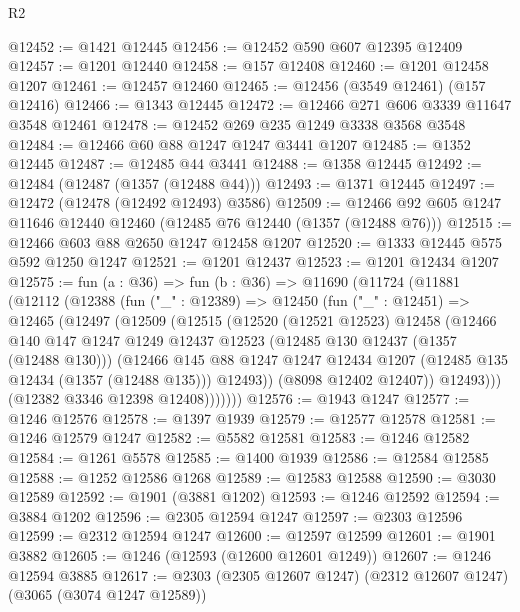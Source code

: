 \begin{lexlean}{R2}
\begin{coremodule}
@12452 := @1421 @12445
@12456 := @12452 @590 @607 @12395 @12409
@12457 := @1201 @12440
@12458 := @157 @12408
@12460 := @1201 @12458 @1207
@12461 := @12457 @12460
@12465 := @12456 (@3549 @12461) (@157 @12416)
@12466 := @1343 @12445
@12472 := @12466 @271 @606 @3339 @11647 @3548 @12461
@12478 := @12452 @269 @235 @1249 @3338 @3568 @3548
@12484 := @12466 @60 @88 @1247 @1247 @3441 @1207
@12485 := @1352 @12445
@12487 := @12485 @44 @3441
@12488 := @1358 @12445
@12492 := @12484 (@12487 (@1357 (@12488 @44)))
@12493 := @1371 @12445
@12497 := @12472 (@12478 (@12492 @12493) @3586)
@12509 := @12466 @92 @605 @1247 @11646 @12440 @12460 (@12485 @76 @12440 (@1357 (@12488 @76)))
@12515 := @12466 @603 @88 @2650 @1247 @12458 @1207
@12520 := @1333 @12445 @575 @592 @1250 @1247
@12521 := @1201 @12437
@12523 := @1201 @12434 @1207
@12575 := fun (a : @36) =>
  fun (b : @36) =>
  @11690
    (@11724
      (@11881
        (@12112
          (@12388
            (fun ("_" : @12389) =>
            @12450
              (fun ("_" : @12451) =>
              @12465
                (@12497
                  (@12509
                    (@12515
                      (@12520
                        (@12521 @12523)
                        @12458
                        (@12466
                          @140
                          @147
                          @1247
                          @1249
                          @12437
                          @12523
                          (@12485 @130 @12437 (@1357 (@12488 @130)))
                          (@12466
                            @145
                            @88
                            @1247
                            @1247
                            @12434
                            @1207
                            (@12485 @135 @12434 (@1357 (@12488 @135)))
                            @12493))
                        (@8098 @12402 @12407))
                      @12493)))
                (@12382 @3346 @12398 @12408)))))))
@12576 := @1943 @1247
@12577 := @1246 @12576
@12578 := @1397 @1939
@12579 := @12577 @12578
@12581 := @1246 @12579 @1247
@12582 := @5582 @12581
@12583 := @1246 @12582
@12584 := @1261 @5578
@12585 := @1400 @1939
@12586 := @12584 @12585
@12588 := @1252 @12586 @1268
@12589 := @12583 @12588
@12590 := @3030 @12589
@12592 := @1901 (@3881 @1202)
@12593 := @1246 @12592
@12594 := @3884 @1202
@12596 := @2305 @12594 @1247
@12597 := @2303 @12596
@12599 := @2312 @12594 @1247
@12600 := @12597 @12599
@12601 := @1901 @3882
@12605 := @1246 (@12593 (@12600 @12601 @1249))
@12607 := @1246 @12594 @3885
@12617 := @2303 (@2305 @12607 @1247) (@2312 @12607 @1247) (@3065 (@3074 @1247 @12589))

\end{coremodule}
\end{lexlean}
